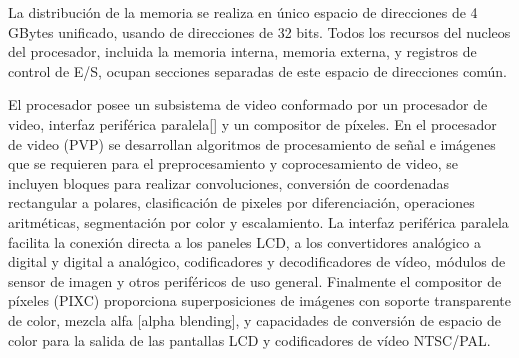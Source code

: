 La distribución de la memoria se realiza en único espacio de direcciones de 4 GBytes  unificado, usando de direcciones de 32 bits. Todos los recursos del nucleos del procesador, incluida la memoria interna, memoria externa, y registros de control de E/S, ocupan secciones separadas de este espacio de direcciones común. 

El procesador posee un subsistema de video conformado por un procesador de video, interfaz periférica paralela[] y un compositor de píxeles. En el procesador de video (PVP) se desarrollan algoritmos de procesamiento de señal e imágenes que se requieren para el preprocesamiento y coprocesamiento de video, se incluyen bloques para realizar convoluciones, conversión de coordenadas rectangular a polares, clasificación de pixeles por diferenciación, operaciones aritméticas, segmentación por color\cite{sevilla} y escalamiento. La interfaz periférica paralela facilita la conexión directa a los paneles LCD, a los convertidores analógico a digital y digital a analógico, codificadores y decodificadores de vídeo, módulos de sensor de imagen y otros periféricos de uso general. Finalmente el compositor de píxeles (PIXC) proporciona superposiciones de imágenes con soporte transparente de color, mezcla alfa [alpha blending], y capacidades de conversión de espacio de color para la salida de las pantallas LCD y codificadores 
de vídeo NTSC/PAL.







